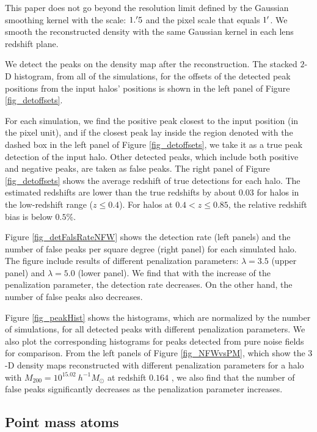 \documentclass[twocolumn]{aastex62}
\begin{document}
This paper does not go beyond the resolution limit defined by the Gaussian
smoothing kernel with the scale: $1.\mbox{$^\prime$} 5$ and the pixel scale
that equals $1\mbox{$^\prime$}$. We smooth the reconstructed density with the same
Gaussian kernel in each lens redshift plane.

We detect the peaks on the density map after the reconstruction. The stacked
$2$-D histogram, from all of the simulations, for the offsets of the detected
peak positions from the input halos' positions is shown in the left panel of
Figure \ref{fig_detoffsets}.

For each simulation, we find the positive peak closest to the input position
(in the pixel unit), and if the closest peak lay inside the region denoted with
the dashed box in the left panel of Figure \ref{fig_detoffsets}, we take it as
a true peak detection of the input halo. Other detected peaks, which include both
positive and negative peaks, are taken as false peaks. The right
panel of Figure \ref{fig_detoffsets} shows the average redshift of true
detections for each halo. The estimated redshifts are lower than the true
redshifts by about $0.03$ for halos in the low-redshift range ($z\leq 0.4$).
For halos at $0.4<z\leq 0.85$, the relative redshift bias is below $0.5\%$.

Figure \ref{fig_detFalsRateNFW} shows the detection rate (left panels) and the
number of false peaks per square degree (right panel) for each simulated halo.
The figure include results of different penalization parameters: $\lambda=3.5$
(upper panel) and $\lambda=5.0$ (lower panel).  We find that with the increase
of the penalization parameter, the detection rate decreases. On the other hand,
the number of false peaks also decreases.

Figure \ref{fig_peakHist} shows the histograms, which are normalized by the
number of simulations, for all detected peaks with different penalization
parameters. We also plot the corresponding histograms for peaks detected from
pure noise fields for comparison. From the left panels of Figure
\ref{fig_NFWvsPM}, which show the $3$-D density maps reconstructed with
different penalization parameters for a halo with $M_{200}=10^{15.02}
~h^{-1}M_{\odot}$ at redshift $0.164$ , we also find that the number of false
peaks significantly decreases as the penalization parameter increases.

\subsection{Point mass atoms}
\label{subsec:test-pm}
\end{document}
